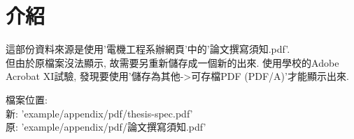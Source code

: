 
\section{介紹}
這部份資料來源是使用'電機工程系辦網頁'中的'論文撰寫須知.pdf'\cite{web:ncku:thesis-need-to-know}.\\

但由於原檔案沒法顯示, 故需要另重新儲存成一個新的出來. 使用學校的Adobe Acrobat XI試驗, 發現要使用'儲存為其他->可存檔PDF (PDF/A)'才能顯示出來.\\


\noindent 檔案位置:\\
\noindent 新: 'example/appendix/pdf/thesis-spec.pdf'\\
\noindent 原: 'example/appendix/pdf/論文撰寫須知.pdf'\\



\EndChapter
